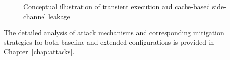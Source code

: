 \begin{figure}[H]
  \centering
  \caption{Conceptual illustration of transient execution and cache-based side-channel leakage}
  \label{fig:transient_execution_placeholder}
\end{figure}

The detailed analysis of attack mechanisms and corresponding mitigation strategies
for both baseline and extended configurations is provided in Chapter~\ref{chap:attacks}.